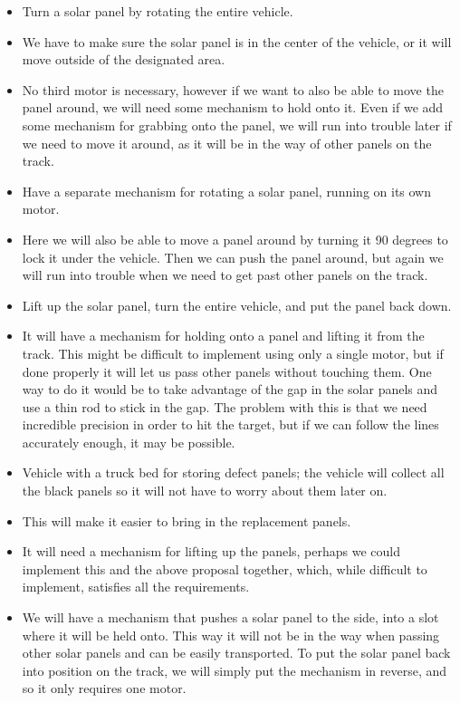 \begin{itemize}
\itemsep1pt\parskip0pt
\item
  Turn a solar panel by rotating the entire vehicle.
\item
  We have to make sure the solar panel is in the center of the vehicle,
  or it will move outside of the designated area.
\item
  No third motor is necessary, however if we want to also be able to
  move the panel around, we will need some mechanism to hold onto it.
  Even if we add some mechanism for grabbing onto the panel, we will run
  into trouble later if we need to move it around, as it will be in the
  way of other panels on the track.
\item
  Have a separate mechanism for rotating a solar panel, running on its
  own motor.
\item
  Here we will also be able to move a panel around by turning it 90
  degrees to lock it under the vehicle. Then we can push the panel
  around, but again we will run into trouble when we need to get past
  other panels on the track.
\item
  Lift up the solar panel, turn the entire vehicle, and put the panel
  back down.
\item
  It will have a mechanism for holding onto a panel and lifting it from
  the track. This might be difficult to implement using only a single
  motor, but if done properly it will let us pass other panels without
  touching them. One way to do it would be to take advantage of the gap
  in the solar panels and use a thin rod to stick in the gap. The
  problem with this is that we need incredible precision in order to hit
  the target, but if we can follow the lines accurately enough, it may
  be possible.
\item
  Vehicle with a truck bed for storing defect panels; the vehicle will
  collect all the black panels so it will not have to worry about them
  later on.
\item
  This will make it easier to bring in the replacement panels.
\item
  It will need a mechanism for lifting up the panels, perhaps we could
  implement this and the above proposal together, which, while difficult
  to implement, satisfies all the requirements.
\item
  We will have a mechanism that pushes a solar panel to the side, into a
  slot where it will be held onto. This way it will not be in the way
  when passing other solar panels and can be easily transported. To put
  the solar panel back into position on the track, we will simply put
  the mechanism in reverse, and so it only requires one motor.
\end{itemize}

